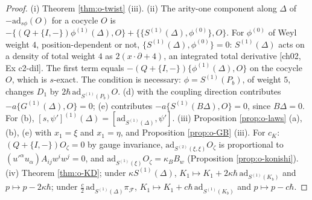 \begin{proof}
(i) Theorem \ref{thm:o-twist} (iii). (ii) The arity-one component along $\Delta$ of $-\mathrm{ad}_{s\phi}(O)$ for a cocycle $O$ is $-\{(Q+\{I,-\})\phi^{(1)}(\Delta),O\}+\{\{S^{(1)}(\Delta),\phi^{(0)}\},O\}$. For $\phi^{(0)}$ of Weyl weight $4$, position-dependent or not, $\{S^{(1)}(\Delta),\phi^{(0)}\}=0$: $S^{(1)}(\Delta)$ acts on a density of total weight $4$ as $2(x\cdot\partial+4)$, an integrated total derivative [ch02, Ex c2-dil]. The first term equals $-(Q+\{I,-\})\{\phi^{(1)}(\Delta),O\}$ on the cocycle $O$, which is $s$-exact. The condition is necessary: $\phi=S^{(1)}(P_b)$, of weight $5$, changes $D_1$ by $2\hbar\,\mathrm{ad}_{S^{(1)}(P_b)}O$. (d) with the coupling direction contributes $-a\{G^{(1)}(\Delta),O\}=0$; (e) contributes $-a\{S^{(1)}(B\Delta),O\}=0$, since $B\Delta=0$. For (b), $[s,\psi']^{(1)}(\Delta)=[\mathrm{ad}_{S^{(1)}(\Delta)},\psi']$. (iii) Proposition \ref{prop:o-laws} (a), (b), (e) with $x_1=\xi$ and $x_1=\eta$, and Proposition \ref{prop:o-GB} (iii). For $c_K$: $(Q+\{I,-\})O_\zeta=0$ by gauge invariance, $\mathrm{ad}_{S^{(2)}(\xi,\xi)}O_\zeta$ is proportional to $(u'^\alpha u_\alpha)A_{ij}w^iw^j=0$, and $\mathrm{ad}_{S^{(1)}(\xi)}O_\zeta=\kappa_BB_w$ (Proposition \ref{prop:o-konishi}). (iv) Theorem \ref{thm:o-KD}; under $\kappa S^{(1)}(\Delta)$, $K_1\mapsto K_1+2\kappa\hbar\,\mathrm{ad}_{S^{(1)}(K_b)}$ and $p\mapsto p-2\kappa\hbar$; under $\tfrac c2\,\mathrm{ad}_{S^{(1)}(\Delta)}\pi_{\mathcal F}$, $K_1\mapsto K_1+c\hbar\,\mathrm{ad}_{S^{(1)}(K_b)}$ and $p\mapsto p-c\hbar$.
\end{proof}

